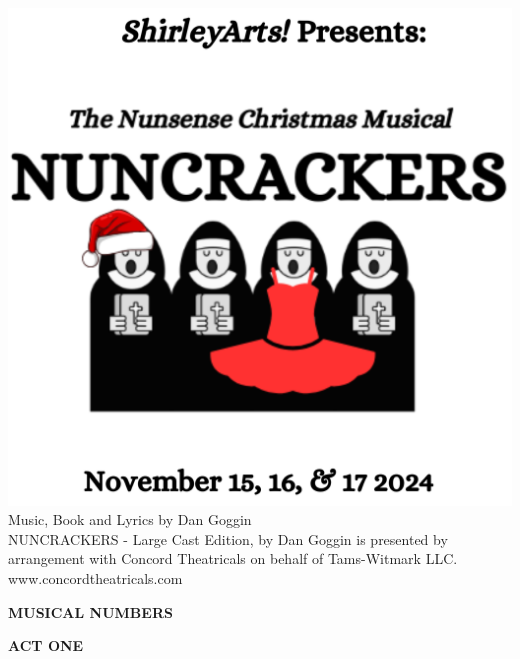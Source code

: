 \documentclass[12pt, a5paper, oneside]{article}
\begin{document}
\newcommand\song[2]{\item\raggedright\textbf{#1}\dotfill \raggedleft\emph{#2}\par}
\newcommand\cast[2]{\textbf{#2}\dotfill \emph{#1}\newline}
\pagestyle{empty} %
\setlength\parindent{0em} %

\begin{center}

\includegraphics[scale=0.6]{media/program_cover.png}
\\
\Large Music, Book and Lyrics by 
Dan Goggin \\ 
\hfill\newline
\normalsize
NUNCRACKERS - Large Cast Edition, by Dan Goggin is presented by arrangement with Concord Theatricals on behalf of Tams-Witmark LLC. \\
www.concordtheatricals.com


\end{center}

\pagebreak
\begin{center}
\Large \textbf{MUSICAL NUMBERS}
\end{center}

\large \textbf{ACT ONE}
\normalsize
\end{document}
